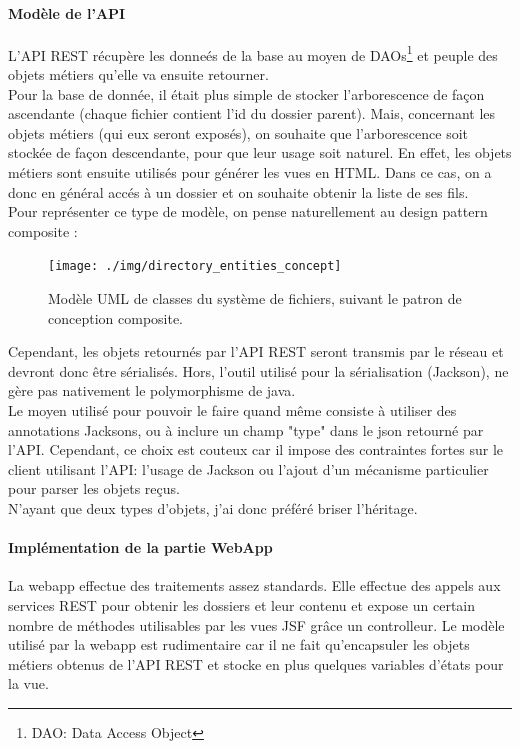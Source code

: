 \paragraph*{Modèle de l'API\\}
L'API REST récupère les donneés de la base au moyen de DAOs\footnote{DAO: Data Access Object} et peuple des objets métiers qu'elle va ensuite retourner.\\

Pour la base de donnée, il était plus simple de stocker l'arborescence de façon ascendante (chaque fichier contient l'id du dossier parent). Mais, concernant les objets métiers (qui eux seront exposés), on souhaite que l'arborescence soit stockée de façon descendante, pour que leur usage soit naturel.
En effet, les objets métiers sont ensuite utilisés pour générer les vues en HTML. Dans ce cas, on a donc en général accés à un dossier et on souhaite obtenir la liste de ses fils. \\

Pour représenter ce type de modèle, on pense naturellement au design pattern composite \cite{bib:compositePattern} : \\
\begin{figure}[H]
  \centering
  \texttt{[image: ./img/directory\_entities\_concept]}
  \caption{\label{fig:mb_va_ast} Modèle UML de classes du système de fichiers, suivant le patron de conception composite.}
\end{figure}

Cependant, les objets retournés par l'API REST seront transmis par le réseau et devront donc être sérialisés. Hors, l'outil utilisé pour la sérialisation (Jackson), ne gère pas nativement le polymorphisme de java. \\
Le moyen utilisé pour pouvoir le faire quand même consiste à utiliser des annotations Jacksons, ou à inclure un champ "type" dans le json retourné par l'API. Cependant, ce choix est couteux car il impose des contraintes fortes sur le client utilisant l'API: l'usage de Jackson ou l'ajout d'un mécanisme particulier pour parser les objets reçus.\\

N'ayant que deux types d'objets, j'ai donc préféré briser l'héritage.


\paragraph*{Implémentation de la partie WebApp\\}
La webapp effectue des traitements assez standards. Elle effectue des appels aux services REST pour obtenir les dossiers et leur contenu et expose un certain nombre de méthodes utilisables par les vues JSF grâce un controlleur.
Le modèle utilisé par la webapp est rudimentaire car il ne fait qu'encapsuler les objets métiers obtenus de l'API REST et stocke en plus quelques variables d'états pour la vue.

